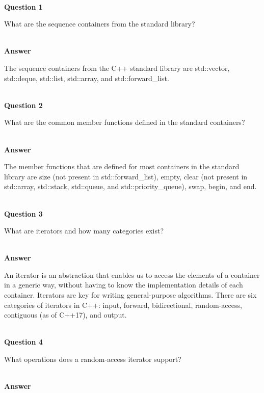 \hspace*{\fill} \\ %
\noindent
\textbf{Question 1}

What are the sequence containers from the standard library?

\hspace*{\fill} \\ %
\noindent
\textbf{Answer}

The sequence containers from the C++ standard library are std::vector, std::deque, std::list, std::array, and std::forward\_list.


\hspace*{\fill} \\ %
\noindent
\textbf{Question 2}

What are the common member functions defined in the standard containers?

\hspace*{\fill} \\ %
\noindent
\textbf{Answer}

The member functions that are defined for most containers in the standard library are size (not present in std::forward\_list), empty, clear (not present in std::array, std::stack, std::queue, and std::priority\_queue), swap, begin, and end.

\hspace*{\fill} \\ %
\noindent
\textbf{Question 3}

What are iterators and how many categories exist?

\hspace*{\fill} \\ %
\noindent
\textbf{Answer}

An iterator is an abstraction that enables us to access the elements of a container in a generic way, without having to know the implementation details of each container. Iterators are key for writing general-purpose algorithms. There are six categories of iterators in C++: input, forward, bidirectional, random-access, contiguous (as of C++17), and output.

\hspace*{\fill} \\ %
\noindent
\textbf{Question 4}

What operations does a random-access iterator support?

\hspace*{\fill} \\ %
\noindent
\textbf{Answer}

